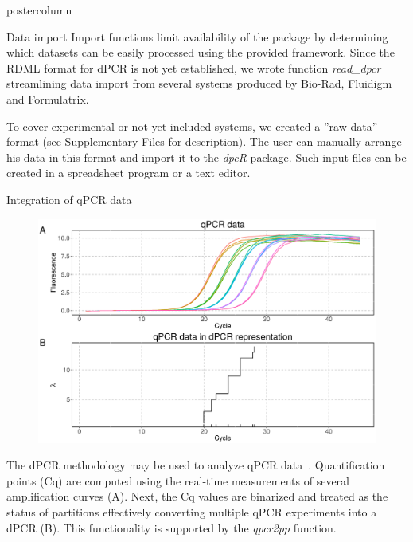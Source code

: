 \documentclass[final]{beamer}\usepackage[]{graphicx}\usepackage[]{color}
\begin{document}
\begin{frame}
\begin{columns}
\begin{column}{.46\textwidth}
\begin{beamercolorbox}[center,wd=\textwidth]{postercolumn}
\begin{minipage}[T]{.95\textwidth}
{\begin{block}{Data import}
Import functions limit availability of the package by determining which datasets 
can be easily processed using the provided framework. Since the RDML format for 
dPCR is not yet established, we wrote function 
\textit{read\_dpcr} streamlining data import from several systems produced by Bio-Rad, 
Fluidigm and Formulatrix. 

\smallskip

To cover experimental or not yet included systems, we 
created a ''raw data'' format (see Supplementary Files for description). The 
user can manually arrange his data in this format and import it to the 
\textit{dpcR} package. Such input files can be created in a spreadsheet program 
or a text editor.

    \end{block}
    \vfill
    
    \begin{block}{Integration of qPCR data}
          \begin{figure}
\begin{center}
\includegraphics{dpcR_figures/qpcr2pp.eps}
\end{center}
\label{workflow}
\end{figure}
    
    The dPCR methodology may be used to analyze qPCR data~\citep{mojtahedi_2014}.
    Quantification points (Cq) are computed using the real-time measurements of 
    several amplification curves (A). Next, the Cq values are binarized and treated as 
    the status of partitions effectively converting multiple qPCR experiments into a 
    dPCR (B). This functionality is supported by the \textit{qpcr2pp} function.
    \end{block}
    \vfill
            }
        \end{minipage}
      \end{beamercolorbox}
    \end{column}
    

\end{columns}
\end{frame}
\end{document}
